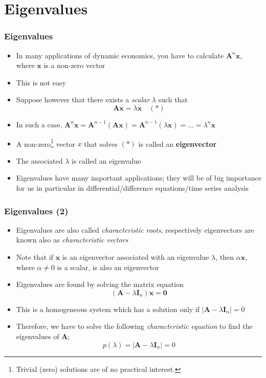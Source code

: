\documentclass[10pt]{beamer}
\theoremstyle{definition}
\begin{document}
\section{Eigenvalues}
\begin{frame}[fragile]
\frametitle{Eigenvalues}
\begin{itemize}
	\item In many applications of dynamic economics, you have to calculate $\mathbf{A}^{n}\mathbf{x}$, where $\mathbf{x}$ is a non-zero vector
	\item This is not easy
	\item Suppose however that there exists a \textit{scalar} $\lambda$ such that
	\[
		\mathbf{Ax} = \lambda \mathbf{x} \quad (*)
	\]
	\item In such a case, $\mathbf{A}^{n}\mathbf{x} = \mathbf{A}^{n-1}(\mathbf{Ax}) = \mathbf{A}^{n-1}(\lambda\mathbf{x}) = \ldots = \lambda^{n}\mathbf{x}$
	\item A non-zero\footnote{Trivial (zero) solutions are of no practical interest.} vector $x$ that solves $(*)$ is called an \textbf{eigenvector}
	\item The associated $\lambda$ is called an eigenvalue
	\item Eigenvalues have many important applications; they will be of big importance for us in particular in differential/difference equations/time series analysis
\end{itemize}
\end{frame}

\begin{frame}[fragile]
\frametitle{Eigenvalues (2)}
\begin{itemize}
	\item Eigenvalues are also called \textit{characteristic roots}, respectively eigenvectors are known also as \textit{characteristic vectors}
	\item Note that if $\mathbf{x}$ is an eigenvector associated with an eigenvalue $\lambda$, then $\alpha\mathbf{x}$, where $\alpha \neq 0$ is a scalar, is also an eigenvector
	\item Eigenvalues are found by solving the matrix equation
	\[
		(\mathbf{A} - \lambda \mathbf{I}_{n})\mathbf{x} = \mathbf{0}
	\]
	\item This is a homogeneous system which has a solution only if $|\mathbf{A} - \lambda \mathbf{I}_{n}| = 0$
	\item Therefore, we have to solve the following \textit{characteristic equation} to find the eigenvalues of $\mathbf{A}$;
	\[
		p(\lambda) = |\mathbf{A} - \lambda \mathbf{I}_{n}| = 0
	\]
\end{itemize}
\end{frame}
\end{document}
